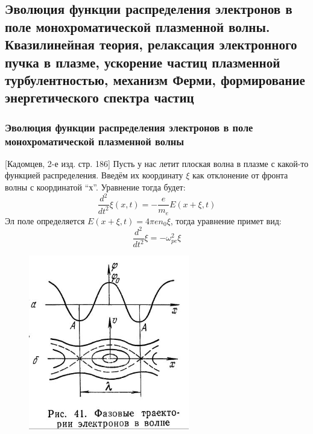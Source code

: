 \documentclass[10pt, a4paper]{article}
\begin{document}
\subsection{Эволюция функции распределения электронов в поле монохроматической плазменной волны. Квазилинейная теория, релаксация электронного пучка в плазме, ускорение частиц 	плазменной турбулентностью, механизм Ферми, формирование энергетического спектра частиц}
\subsubsection{Эволюция функции распределения электронов в поле монохроматической плазменной волны}
[Кадомцев, 2-е изд. стр. 186]
Пусть у нас летит плоская волна в плазме с какой-то функцией распределения. Введём их координату $\xi$ как отклонение от фронта волны с координатой “х”.
Уравнение тогда будет:
\begin{equation}
	\frac{d^2}{dt^{2}} \xi (x,t) = - \frac{e}{m_e} E(x+\xi,t)
\end{equation}
Эл поле определяется $E(x+\xi,t)=4 \pi e n_0 \xi$, тогда уравнение примет вид:
\begin{equation}
	\frac{d^2}{dt^{2}} \xi = - \omega^{2}_{pe} \xi
\end{equation}

\begin{figure}[ht]
	\begin{center}
		\includegraphics[width=70mm]{zatuh_landau_nonlinear_1.JPG}
	\end{center}
\end{figure}
\end{document}
